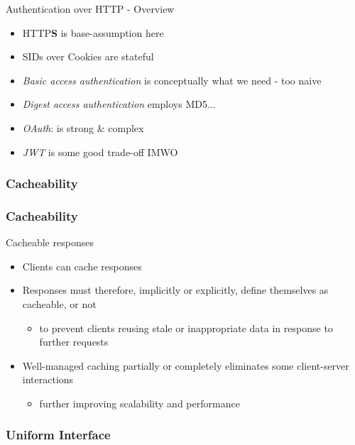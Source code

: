 \begin{frame}[allowframebreaks]
	\begin{block}{Authentication over HTTP - Overview}
		\begin{itemize}
			\item HTTP\textbf{S} is base-assumption here
			\item SIDs over Cookies are stateful
			\item \emph{Basic access authentication} is conceptually what we need - too naive
			\item \emph{Digest access authentication} employs MD5...
			\item \emph{OAuth}: is strong \& complex
			\item \emph{JWT} is some good trade-off IMWO
		\end{itemize}
	\end{block}
\end{frame}

\subsubsection{Cacheability}

\begin{frame}
	\frametitle{Cacheability}
	
	\begin{block}{Cacheable responses}
		\begin{itemize}
			\item Clients can cache responses
			\item Responses must therefore, implicitly or explicitly, define themselves as cacheable, or not
			\begin{itemize}
				\item to prevent clients reusing stale or inappropriate data in response to further requests
			\end{itemize}
			\item Well-managed caching partially or completely eliminates some client-server interactions
			\begin{itemize}
				\item further improving scalability and performance
			\end{itemize}
		\end{itemize}
	
	\end{block}
\end{frame}

\subsubsection{Uniform Interface}

